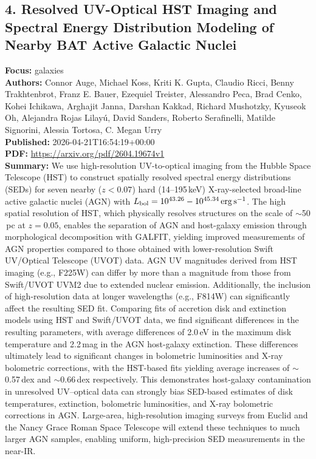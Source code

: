 \documentclass[11pt]{article}
\begin{document}
\subsection*{4. Resolved UV-Optical HST Imaging and Spectral Energy Distribution Modeling of Nearby BAT Active Galactic Nuclei}
\textbf{Focus:} galaxies\\
\textbf{Authors:} Connor Auge, Michael Koss, Kriti K. Gupta, Claudio Ricci, Benny Trakhtenbrot, Franz E. Bauer, Ezequiel Treister, Alessandro Peca, Brad Cenko, Kohei Ichikawa, Arghajit Janna, Darshan Kakkad, Richard Mushotzky, Kyuseok Oh, Alejandra Rojas Lilayú, David Sanders, Roberto Serafinelli, Matilde Signorini, Alessia Tortosa, C. Megan Urry\\
\textbf{Published:} 2026-04-21T16:54:19+00:00\\
\textbf{PDF:} \href{https://arxiv.org/pdf/2604.19674v1}{https://arxiv.org/pdf/2604.19674v1}\\
\textbf{Summary:}
We use high-resolution UV-to-optical imaging from the Hubble Space Telescope (HST) to construct spatially resolved spectral energy distributions (SEDs) for seven nearby ($z<0.07$) hard (14--195$\,$keV) X-ray-selected broad-line active galactic nuclei (AGN) with $L_{\rm bol}=10^{43.26}-10^{45.34}\,\rm{erg\,s^{-1}}$. The high spatial resolution of HST, which physically resolves structures on the scale of $\sim$50$\,$pc at $z=0.05$, enables the separation of AGN and host-galaxy emission through morphological decomposition with GALFIT, yielding improved measurements of AGN properties compared to those obtained with lower-resolution Swift UV/Optical Telescope (UVOT) data. AGN UV magnitudes derived from HST imaging (e.g., F225W) can differ by more than a magnitude from those from Swift/UVOT UVM2 due to extended nuclear emission. Additionally, the inclusion of high-resolution data at longer wavelengths (e.g., F814W) can significantly affect the resulting SED fit. Comparing fits of accretion disk and extinction models using HST and Swift/UVOT data, we find significant differences in the resulting parameters, with average differences of 2.0$\,$eV in the maximum disk temperature and 2.2$\,$mag in the AGN host-galaxy extinction. These differences ultimately lead to significant changes in bolometric luminosities and X-ray bolometric corrections, with the HST-based fits yielding average increases of $\sim$0.57$\,$dex and $\sim$0.66$\,$dex respectively. This demonstrates host-galaxy contamination in unresolved UV--optical data can strongly bias SED-based estimates of disk temperatures, extinction, bolometric luminosities, and X-ray bolometric corrections in AGN. Large-area, high-resolution imaging surveys from Euclid and the Nancy Grace Roman Space Telescope will extend these techniques to much larger AGN samples, enabling uniform, high-precision SED measurements in the near-IR.
\end{document}
